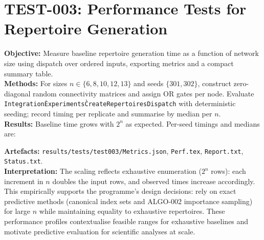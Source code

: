 \documentclass{article}
\begin{document}
\section{TEST-003: Performance Tests for Repertoire Generation}
\textbf{Objective:} Measure baseline repertoire generation time as a function of network size using dispatch over ordered inputs, exporting metrics and a compact summary table.\\
\textbf{Methods:} For sizes $n\in\{6,8,10,12,13\}$ and seeds $\{301,302\}$, construct zero-diagonal random connectivity matrices and assign OR gates per node. Evaluate \texttt{Integration\`Experiments\`CreateRepertoiresDispatch} with deterministic seeding; record timing per replicate and summarise by median per $n$.\\
\textbf{Results:} Baseline time grows with $2^n$ as expected. Per-seed timings and medians are:\\
\begin{center}
\end{center}
\medskip
\begin{center}
\end{center}
\textbf{Artefacts:} \texttt{results/tests/test003/Metrics.json}, \texttt{Perf.tex}, \texttt{Report.txt}, \texttt{Status.txt}.\\
\textbf{Interpretation:} The scaling reflects exhaustive enumeration ($2^n$ rows): each increment in $n$ doubles the input rows, and observed times increase accordingly. This empirically supports the programme’s design decisions: rely on exact predictive methods (canonical index sets and ALGO-002 importance sampling) for large $n$ while maintaining equality to exhaustive repertoires. These performance profiles contextualise feasible ranges for exhaustive baselines and motivate predictive evaluation for scientific analyses at scale.
\end{document}
